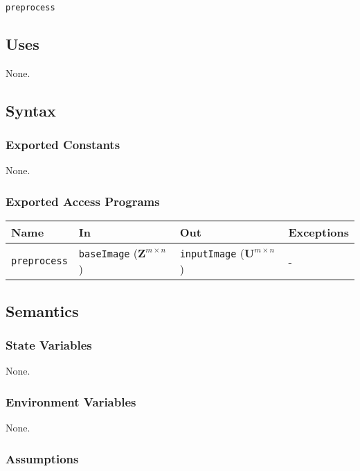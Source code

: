 \documentclass[12pt, titlepage]{article}
\def\code#1{\texttt{#1}}
\begin{document}
\code{preprocess}

\subsection{Uses}

None.

\subsection{Syntax}

\subsubsection{Exported Constants}

None.

\subsubsection{Exported Access Programs}

\begin{center}
\begin{tabular}{p{2cm} p{4cm} p{4cm} p{2cm}}
\hline
\textbf{Name} & \textbf{In} & \textbf{Out} & \textbf{Exceptions} \\
\hline
\code{preprocess} & \code{baseImage} ($\mathbf{Z}^{m \times n}$) & \code{inputImage} ($\mathbf{U}^{m \times n}$) & - \\
\hline
\end{tabular}
\end{center}

\subsection{Semantics}

\subsubsection{State Variables}

None.

\subsubsection{Environment Variables}

None.

\subsubsection{Assumptions}
\end{document}
